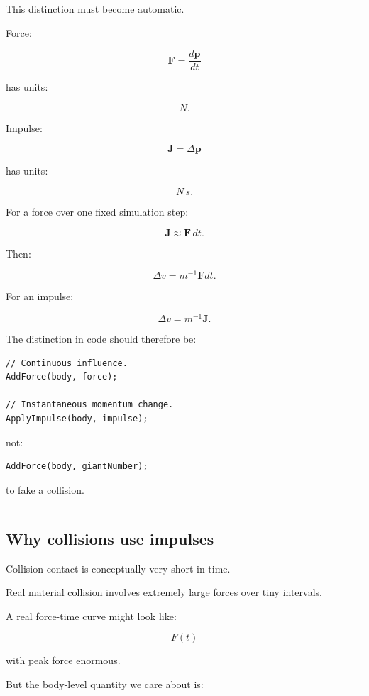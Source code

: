 This distinction must become automatic.

Force:

\[
\boxed{
\mathbf F
=
\frac{d\mathbf p}{dt}
}
\]

has units:

\[
N.
\]

Impulse:

\[
\boxed{
\mathbf J
=
\Delta\mathbf p
}
\]

has units:

\[
N\,s.
\]

For a force over one fixed simulation step:

\[
\mathbf J
\approx
\mathbf F\,dt.
\]

Then:

\[
\Delta v
=
m^{-1}\mathbf Fdt.
\]

For an impulse:

\[
\Delta v
=
m^{-1}\mathbf J.
\]

The distinction in code should therefore be:

\begin{verbatim}
// Continuous influence.
AddForce(body, force);

// Instantaneous momentum change.
ApplyImpulse(body, impulse);
\end{verbatim}

not:

\begin{verbatim}
AddForce(body, giantNumber);
\end{verbatim}

to fake a collision.

\begin{center}\rule{0.5\linewidth}{0.5pt}\end{center}

\subsection{Why collisions use impulses}\label{06-engine-ii-ch036-why-collisions-use-impulses}

Collision contact is conceptually very short in time.

Real material collision involves extremely large forces over tiny intervals.

A real force-time curve might look like:

\[
F(t)
\]

with peak force enormous.

But the body-level quantity we care about is:

